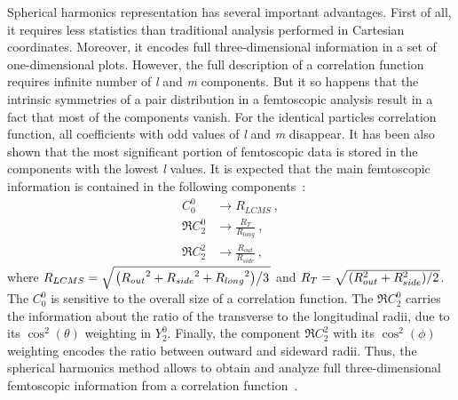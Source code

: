       Spherical harmonics representation has several important advantages.
      First of all, it requires less statistics than traditional analysis performed in Cartesian coordinates.
      Moreover, it encodes full three-dimensional information in a set of one-dimensional plots. 
      However, the full description of a correlation function requires infinite number of \textit{l} and \textit{m} components.
      But it so happens that the intrinsic symmetries of a pair distribution in a femtoscopic analysis result in a fact that most of the components vanish.
      For the identical particles correlation function, all coefficients with odd values of \textit{l} and \textit{m} disappear.
      It has been also shown that the most significant portion of femtoscopic data is stored in the components with the lowest \textit{l} values.
      It is expected that the main femtoscopic information is contained in the following components~\cite{nonidfemto}:
      \begin{align}
        C^0_0 &\to R_{LCMS}~, \\
        \Re C^0_2 &\to \frac{R_T}{R_{long}}~, \\
        \Re C^2_2 &\to \frac{R_{out}}{R_{side}}~,
      \end{align}
      where $R_{LCMS} = \sqrt{ \left. \left( {R_{out}}^2 + {R_{side}}^2 + {R_{long}}^2 \right) \middle/ 3 \right. }$ and $R_{T} = \sqrt{ \left. \left( R_{out}^2 + R_{side}^2 \right) \middle/2 \right. }$.
      The $C^0_0$ is sensitive to the overall size of a correlation function.
      The $\Re C^0_2$ carries the information about the ratio of the transverse to the longitudinal radii, due to its $\cos^2(\theta)$ weighting in $Y^0_2$.
      Finally, the component $\Re C^2_2$ with its $\cos^2(\phi)$ weighting encodes the ratio between outward and sideward radii.
      Thus, the spherical harmonics method allows to obtain and analyze full three-dimensional femtoscopic information from a correlation function~\cite{nonidfemto}.


